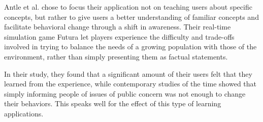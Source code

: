 Antle et al.\citep{AntleFutura} chose to focus their application not on teaching users about specific concepts, but rather to give users a better understanding of familiar concepts and facilitate behavioral change through a shift in awareness. Their real-time simulation game Futura let players experience the difficulty and trade-offs involved in trying to balance the needs of a growing population with those of the environment, rather than simply presenting them as factual statements.

In their study, they found that a significant amount of their users felt that they learned from the experience, while contemporary studies of the time showed that simply informing people of issues of public concern was not enough to change their behaviors. This speaks well for the effect of this type of learning applications.



